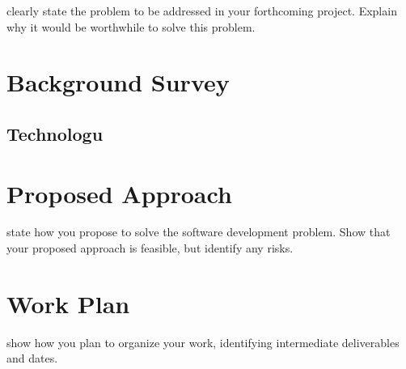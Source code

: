 \documentclass{interim}
\begin{document}
clearly state the problem to be addressed in your forthcoming project. Explain why it would be worthwhile to solve this problem.

\section{Background Survey}

\subsection{Technologu}

\section{Proposed Approach}

state how you propose to solve the software development problem. Show that your proposed approach is feasible, but identify any risks.

\section{Work Plan}

show how you plan to organize your work, identifying intermediate deliverables and dates.



\end{document}
